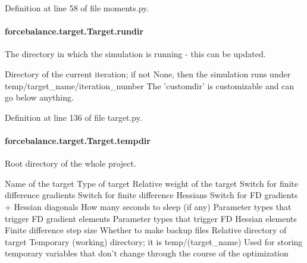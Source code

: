 Definition at line 58 of file moments.\-py.

\hypertarget{classforcebalance_1_1target_1_1Target_a6872de5b2d4273b82336ea5b0da29c9e}{
\paragraph[{rundir}]{\setlength{\rightskip}{0pt plus 5cm}forcebalance.\-target.\-Target.\-rundir\hspace{0.3cm}{\ttfamily [inherited]}}}\label{classforcebalance_1_1target_1_1Target_a6872de5b2d4273b82336ea5b0da29c9e}


The directory in which the simulation is running -\/ this can be updated. 

Directory of the current iteration; if not None, then the simulation runs under temp/target\-\_\-name/iteration\-\_\-number The 'customdir' is customizable and can go below anything.

Definition at line 136 of file target.\-py.

\hypertarget{classforcebalance_1_1target_1_1Target_aa1f01b5b78db253b5b66384ed11ed193}{
\paragraph[{tempdir}]{\setlength{\rightskip}{0pt plus 5cm}forcebalance.\-target.\-Target.\-tempdir\hspace{0.3cm}{\ttfamily [inherited]}}}\label{classforcebalance_1_1target_1_1Target_aa1f01b5b78db253b5b66384ed11ed193}


Root directory of the whole project. 

Name of the target Type of target Relative weight of the target Switch for finite difference gradients Switch for finite difference Hessians Switch for F\-D gradients + Hessian diagonals How many seconds to sleep (if any) Parameter types that trigger F\-D gradient elements Parameter types that trigger F\-D Hessian elements Finite difference step size Whether to make backup files Relative directory of target Temporary (working) directory; it is temp/(target\-\_\-name) Used for storing temporary variables that don't change through the course of the optimization 

